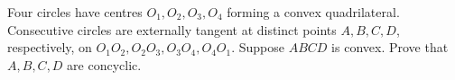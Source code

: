 Four circles have centres $ O_1,O_2,O_3,O_4 $ forming a convex quadrilateral. Consecutive circles are externally tangent at distinct points $ A,B,C,D $, respectively, on $ O_1O_2,O_2O_3,O_3O_4,O_4O_1 $. Suppose $ ABCD $ is convex. Prove that $ A,B,C,D $ are concyclic.
